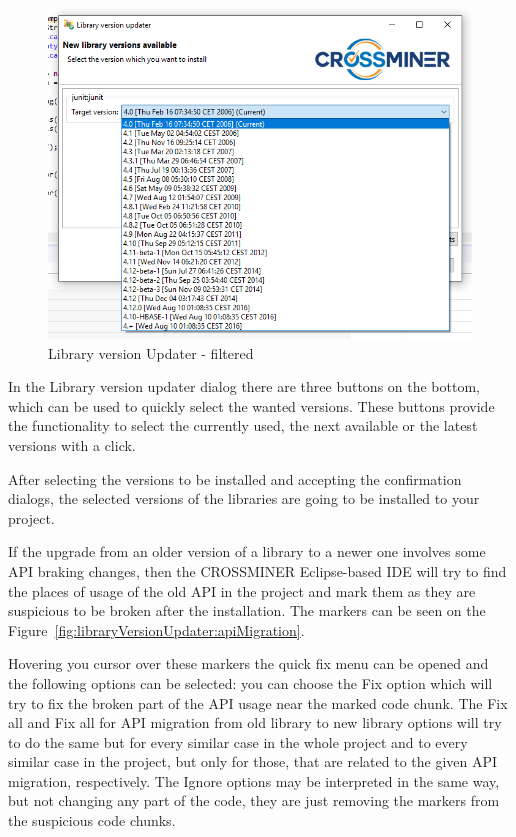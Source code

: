 \documentclass[11pt,a4paper]{book}
\begin{document}
\begin{figure}[h]
	\centering
	\includegraphics[width=\linewidth]{pic/library-version-updater-filtered.png}
	\caption{Library version Updater - filtered}
	\label{fig:libraryVersionUpdater:filtered}
\end{figure}

In the Library version updater dialog there are three buttons on the bottom, which can be used to quickly select the wanted versions. These buttons provide the functionality to select the currently used, the next available or the latest versions with a click.

After selecting the versions to be installed and accepting the confirmation dialogs, the selected versions of the libraries are going to be installed to your project.

If the upgrade from an older version of a library to a newer one involves some API braking changes, then the CROSSMINER Eclipse-based IDE will try to find the places of usage of the old API in the project and mark them as they are suspicious to be broken after the installation. The markers can be seen on the Figure~\ref{fig:libraryVersionUpdater:apiMigration}.

Hovering you cursor over these markers the quick fix menu can be opened and the following options can be selected: you can choose the Fix option which will try to fix the broken part of the API usage near the marked code chunk. The Fix all and Fix all for API migration from old library to new library options will try to do the same but for every similar case in the whole project and to every similar case in the project, but only for those, that are related to the given API migration, respectively. The Ignore options may be interpreted in the same way, but not changing any part of the code, they are just removing the markers from the suspicious code chunks.
\end{document}
